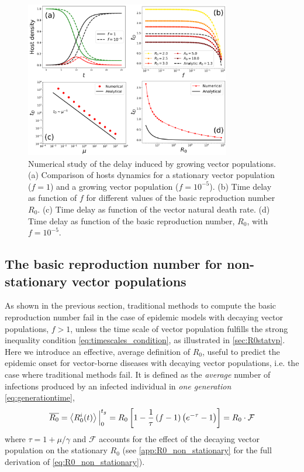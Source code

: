 \begin{figure}[H]
    \centering
    \includegraphics[width=0.8\textwidth]{Figures/delay.pdf}
    \caption[Numerical study of the delay induced by growing vector
    populations]{Numerical study of the delay induced by growing vector
    populations. (a) Comparison of hosts dynamics for a stationary vector
    population ($f=1$) and a growing vector population ($f=10^{-5}$). (b) Time
    delay as function of $f$ for different values of the basic reproduction
    number
    $R_0$. (c) Time delay as function of the vector natural death rate. (d)
    Time
    delay as function of the basic reproduction number, $R_0$, with
    $f=10^{-5}$.}
    \label{fig:delay}
\end{figure}

\subsection{The basic reproduction number for non-stationary vector
    populations}

As shown in the previous section, traditional methods to compute the basic
reproduction number fail in the case of epidemic models with decaying vector
populations, $f>1$, unless the time scale of vector population fulfills the
strong inequality condition \cref{eq:timescales_condition}, as illustrated in
\cref{sec:R0statvp}. Here we introduce an effective, average definition of
$R_0$, useful to predict the epidemic onset for vector-borne diseases with
decaying vector populations, i.e. the case where traditional methods fail. It
is defined as the \textit{average} number of infections produced by an infected
individual in \textit{one generation} \cref{eq:generationtime},
\begin{equation}\label{eq:R0_non_stationary}
    \overline{R_0}=\left<R_{0}^{i}(t)\right>\Big\rvert_{0}^{t_g}=
    R_0\left[1-\frac{1}{\tau}\left(f-1\right)
        \left(e^{-\tau}-1\right)\right]=R_0\cdot\mathcal{F}
\end{equation}
where $\tau=1+\mu/\gamma$ and $\mathcal{F}$ accounts for the effect of the
decaying vector population on the stationary $R_0$ (see
\cref{app:R0_non_stationary} for the full derivation of
\cref{eq:R0_non_stationary}).

